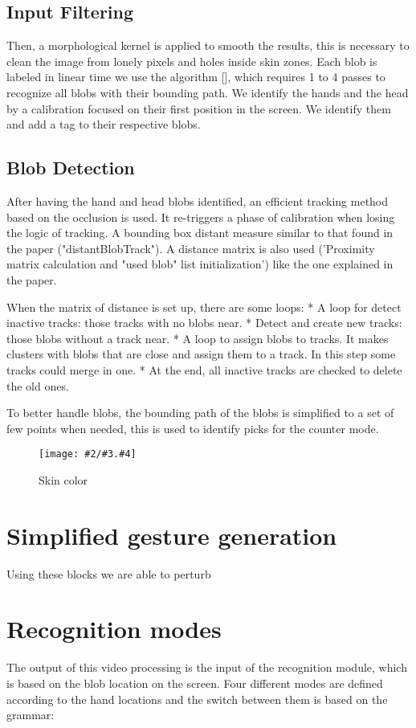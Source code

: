 \documentclass{llncs}
\newcommand{\imagepathext}[5]{%
\begin{figure}[hbtp]
\hfil\texttt{[image: \#2/\#3.\#4]}\hfil
\caption{#5\label{#3}}
\end{figure}}
\newcommand{\png}[2]{\imagepathext{width=\columnwidth}{pics}{#1}{png}{#2}}
\begin{document}
\subsection{Input Filtering}
Then, a morphological kernel is applied to smooth the results, this is necessary to clean the image from lonely pixels and holes inside skin zones.
Each blob is labeled in linear time we use the algorithm [], which requires 1 to 4 passes to recognize all blobs with their bounding path.
We identify the hands and the head by a calibration focused on their first position in the screen. We identify them and add a tag to their respective blobs.

\subsection{Blob Detection}
After having the hand and head blobs identified, an efficient tracking method based on the occlusion is used. It re-triggers a phase of calibration when losing the logic of tracking.
A bounding box distant measure similar to that found in the paper \cite{app06} ("distantBlobTrack"). A distance matrix is also used ('Proximity matrix calculation and "used blob" list initialization') like the one explained in the paper. 

When the matrix of distance is set up, there are some loops:
* A loop for detect inactive tracks: those tracks with no blobs near.
* Detect and create new tracks: those blobs without a track near.
* A loop to assign blobs to tracks. It makes clusters with blobs that are close and assign them to a track. In this step some tracks could merge in one.
* At the end, all inactive tracks are checked to delete the old ones.

To better handle blobs, the bounding path of the blobs is simplified to a set of few points when needed, this is used to identify picks for the counter mode.

\png{skincolor}{Skin color}


\section{Simplified gesture generation}
Using these blocks we are able to perturb


\section{Recognition modes}
The output of this video processing is the input of the recognition module, which is based on the blob location on the screen. Four different modes are defined according to the hand locations and the switch between them is based on the grammar:
\end{document}
